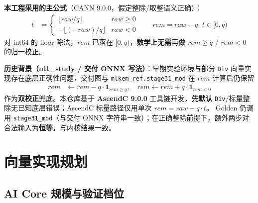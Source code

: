 \documentclass[UTF8,a4paper,11pt]{ctexart}
\begin{document}
\textbf{本工程采用的主公式}（CANN 9.0.0，假定整除/取整语义正确）：
\begin{align}
  t &= \begin{cases}
    \lfloor raw/q \rfloor & raw \ge 0 \\
    -\lfloor (-raw)/q \rfloor & raw < 0
  \end{cases} \qquad rem = raw - q\cdot t \in [0,q)
\end{align}
对 int64 的 floor 除法，$rem$ 已落在 $[0,q)$，\textbf{数学上无需}再做 $rem\ge q$ / $rem<0$ 的归一校正。

\textbf{历史背景（ntt\_study / 交付 ONNX 写法）}：早期实验环境与部分 \texttt{Div} 向量实现存在底层正确性问题，交付图与 \texttt{mlkem\_ref.stage31\_mod} 在 $rem$ 计算后仍保留
\begin{align}
  rem &\leftarrow rem - q\cdot \mathbf{1}_{rem\ge q}, \quad
  rem \leftarrow rem + q\cdot \mathbf{1}_{rem<0}
\end{align}
作为\textbf{双校正}兜底。本仓库基于 \textbf{AscendC 9.0.0} 工具链开发，\textbf{先默认} \texttt{Div}/标量整除无已知底层错误；AscendC 标量路径仅用单次 $rem=raw-q\cdot t$。
Golden 仍调用 \texttt{stage31\_mod}（与交付 ONNX 字符串一致）；在正确整除前提下，额外两步对合法输入为\textbf{恒等}，与内核结果一致。

\section{向量实现规划}

\subsection{AI Core 规模与验证档位}
\label{sec:aicore}
\end{document}

